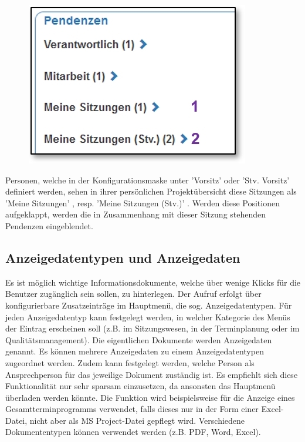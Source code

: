 \begin{figure}   %
  \vspace{-30pt}      %
  \begin{center}
    \includegraphics[width=1\linewidth]{../chapters/13_Konfigurationen/pictures/Sitzungsart_Zuweisung.jpg}
  \end{center}
  \vspace{-20pt}
  \vspace{-10pt}
\end{figure}

Personen, welche in der Konfigurationsmaske unter 'Vorsitz' oder 'Stv. Vorsitz' definiert werden, sehen in ihrer persönlichen Projektübersicht diese Sitzungen als 'Meine Sitzungen' , resp. 'Meine Sitzungen (Stv.)' . Werden diese Positionen aufgeklappt, werden die in Zusammenhang mit dieser Sitzung stehenden Pendenzen eingeblendet. 

\subsection{Anzeigedatentypen und Anzeigedaten}
\label{bkm:Ref20190509001}

Es ist möglich wichtige Informationsdokumente, welche über wenige Klicks für die Benutzer zugänglich sein sollen, zu hinterlegen. Der Aufruf erfolgt über konfigurierbare Zusatzeinträge im Hauptmenü, die sog. Anzeigedatentypen. Für jeden Anzeigedatentyp kann festgelegt werden, in welcher Kategorie des Menüs der Eintrag erscheinen soll (z.B. im Sitzungswesen, in der Terminplanung oder im Qualitätsmanagement). Die eigentlichen Dokumente werden Anzeigedaten genannt. Es können mehrere Anzeigedaten zu einem Anzeigedatentypen zugeordnet werden. Zudem kann festgelegt werden, welche Person als Ansprechperson für das jeweilige Dokument zuständig ist. Es empfiehlt sich diese Funktionalität nur sehr sparsam einzusetzen, da ansonsten das Hauptmenü überladen werden könnte. Die Funktion wird beispielsweise für die Anzeige eines Gesamtterminprogramms verwendet, falls dieses nur in der Form einer Excel-Datei, nicht aber als MS Project-Datei gepflegt wird. Verschiedene Dokumententypen können verwendet werden (z.B. PDF, Word, Excel).

